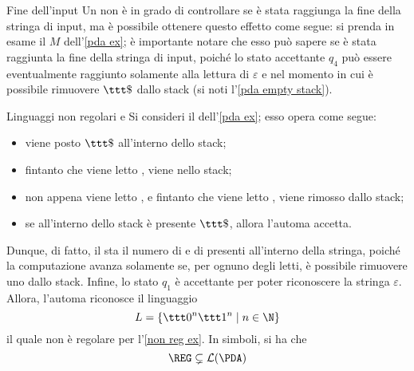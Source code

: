 \documentclass[a4paper, 12pt]{report}
\begin{document}
    \begin{framedobs}{Fine dell'input}
        Un \PDA non è in grado di controllare se è stata raggiunga la fine della stringa di input, ma è possibile ottenere questo effetto come segue: si prenda in esame il \PDA $M$ dell'\cref{pda ex}; è importante notare che esso può sapere se è stata raggiunta la fine della stringa di input, poiché lo stato accettante $q_4$ può essere eventualmente raggiunto solamente alla lettura di $\varepsilon$ e nel momento in cui è possibile rimuovere $\ttt \$$ dallo stack (si noti l'\cref{pda empty stack}).
    \end{framedobs}

    \begin{framedobs}{Linguaggi non regolari e \PDA}
        Si consideri il \PDA dell'\cref{pda ex}; esso opera come segue:

        \begin{itemize}
            \item viene posto $\ttt \$$ all'interno dello stack;
            \item fintanto che viene letto , viene   nello stack;
            \item non appena viene letto , e fintanto che viene letto , viene rimosso  dallo stack;
            \item se all'interno dello stack è presente $\ttt \$$, allora l'automa accetta.
        \end{itemize}

        Dunque, di fatto, il \PDA sta  il numero di  e di  presenti all'interno della stringa, poiché la computazione avanza solamente se, per ognuno degli  letti, è possibile rimuovere uno  dallo stack. Infine, lo stato $q_1$ è accettante per poter riconoscere la stringa $\varepsilon$. Allora, l'automa riconosce il linguaggio $$L = \{\ttt 0 ^n \ttt 1 ^n \mid n \in \N\}$$ il quale non è regolare per l'\cref{non reg ex}. In simboli, si ha che $$\mathrm{\REG} \subsetneq \mathcal{L}(\mathrm{\PDA})$$
    \end{framedobs}
\end{document}
